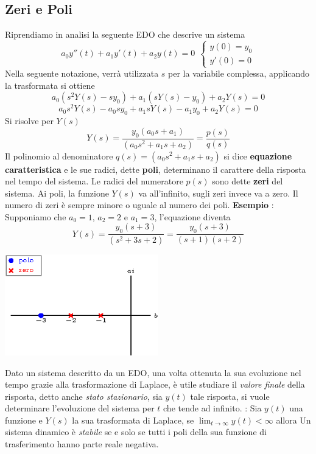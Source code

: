 \documentclass[10pt, letterpaper]{report}
\begin{document}
\subsection{Zeri e Poli}
Riprendiamo in analisi la seguente EDO che descrive un sistema 
$$ a_0{y''(t)}+ a_1{y'(t)}+a_2y(t)=0 \ \ \begin{cases}
    y(0)=y_0   \\ y'(0)=0
\end{cases}$$
Nella seguente notazione, verrà utilizzata $s$ per 
la variabile complessa, applicando la trasformata si ottiene 
$$a_0(s^2Y(s)-sy_0)+a_1(sY(s)-y_0)+a_2Y(s)=0$$ 
$$ a_0s^2Y(s)-a_0sy_0+a_1sY(s)-a_1y_0+a_2Y(s)=0$$
Si risolve per $Y(s)$
$$ 
Y(s)=\frac{y_0(a_0s+a_1)}{(a_0s^2+a_1s+a_2)}=\frac{p(s)}{q(s)}
$$
Il polinomio al denominatore $q(s)=(a_0s^2+a_1s+a_2)$ si dice \textbf{equazione caratteristica} e le sue 
radici, dette \textbf{poli}, determinano il carattere della risposta nel tempo del sistema. Le radici del 
numeratore $p(s)$ sono dette \textbf{zeri} del sistema. Ai poli, la funzione $Y(s)$ va all'infinito, 
sugli zeri invece va a zero. Il numero di zeri è sempre minore o uguale al numero dei poli.\acc 
\textbf{Esempio} : Supponiamo che $a_0=1$, $a_2=2$ e $a_1=3$, l'equazione diventa 
$$ 
Y(s)=\frac{y_0(s+3)}{(s^2+3s+2)} = \frac{y_0(s+3)}{(s+1)(s+2)}
$$\begin{center}
    \includegraphics[width=0.5\textwidth ]{images/polizeri.eps}
\end{center}
Dato un sistema descritto da un EDO,
una volta ottenuta la sua evoluzione nel tempo grazie alla trasformazione di 
Laplace, è utile studiare il \textit{valore finale} della risposta, detto anche 
\textit{stato stazionario}, sia $y(t)$ tale risposta, si vuole determinare l'evoluzione 
del sistema per $t$ che tende ad infinito. \acc 
{} : Sia $y(t)$ una funzione e $Y(s)$ la sua trasformata di Laplace, 
se $\lim_{t\rightarrow \infty}y(t)<\infty$ allora
  Un sistema dinamico è \textit{stabile} se e solo se tutti i poli della sua funzione di 
 trasferimento hanno parte reale negativa.
\end{document}
